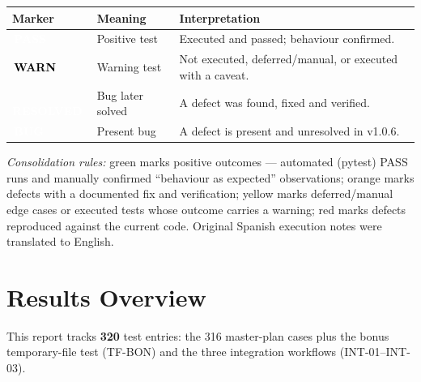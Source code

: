 \documentclass[12pt,a4paper]{article}
\newcommand{\statuspass}{\colorbox{statusgreen}{\textcolor{white}{\textbf{\,PASS\,}}}}
\newcommand{\statuswarn}{\colorbox{statusyellow}{\textcolor{black}{\textbf{\,WARN\,}}}}
\newcommand{\statusresolved}{\colorbox{statusorange}{\textcolor{white}{\textbf{\,RESOLVED\,}}}}
\newcommand{\statusbug}{\colorbox{statusred}{\textcolor{white}{\textbf{\,BUG\,}}}}
\begin{document}
\begin{center}
\begin{tabular}{lll}
\toprule
\textbf{Marker} & \textbf{Meaning} & \textbf{Interpretation} \\
\midrule
\statuspass & Positive test & Executed and passed; behaviour confirmed. \\
\statuswarn & Warning test & Not executed, deferred/manual, or executed with a caveat. \\
\statusresolved & Bug later solved & A defect was found, fixed and verified. \\
\statusbug & Present bug & A defect is present and unresolved in v1.0.6. \\
\bottomrule
\end{tabular}
\end{center}

\smallskip
\noindent
\textit{Consolidation rules:} green marks positive outcomes --- automated
(pytest) PASS runs and manually confirmed ``behaviour as expected''
observations; orange marks defects with a documented fix and verification;
yellow marks deferred/manual edge cases or executed tests whose outcome
carries a warning; red marks defects reproduced against the current code.
Original Spanish execution notes were translated to English.

\newpage
\section{Results Overview}

This report tracks \textbf{320} test entries: the 316 master-plan cases plus
the bonus temporary-file test (TF-BON) and the three integration workflows
(INT-01--INT-03).
\end{document}
